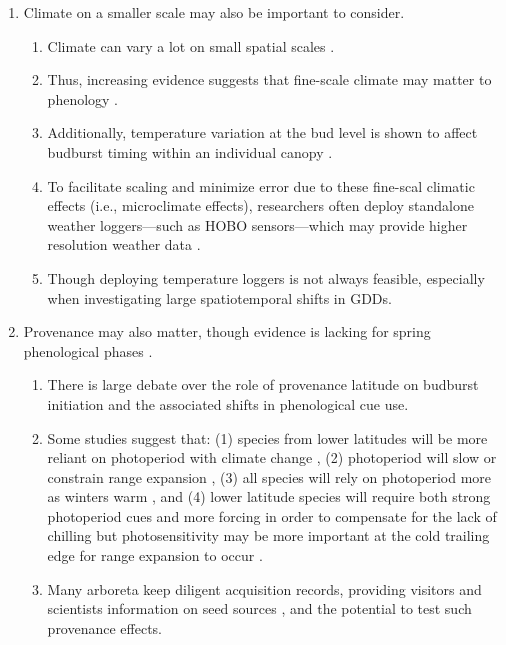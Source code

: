 \documentclass{article}\usepackage[]{graphicx}\usepackage[]{color}
\begin{document}
\begin{enumerate}
\item Climate on a smaller scale may also be important to consider. 
  \begin{enumerate} 
  \item Climate can vary a lot on small spatial scales \citep[][e.g., as much as 2.6$^{\circ}$C between sensors at the same vineyard or up to 6.6$^{\circ}$C within 1 km spatial units in northern Europe]{deResseguier2020,Lenoir2013}.
  \item Thus, increasing evidence suggests that fine-scale climate may matter to phenology \citep{Lembrechts2019}.
  \item Additionally, temperature variation at the bud level is shown to affect budburst timing within an individual canopy \citep{Lembrechts2019}.
  \item To facilitate scaling and minimize error due to these fine-scal climatic effects (i.e., microclimate effects), researchers often deploy standalone weather loggers---such as HOBO sensors---which may provide higher resolution weather data \citep{Schwartz2013a,Whiteman2000}.
  \item Though deploying temperature loggers is not always feasible, especially when investigating large spatiotemporal shifts in GDDs. 
  \end{enumerate}
  
\item Provenance may also matter, though evidence is lacking for spring phenological phases \citep{Aitken2015, McKown2013}.
  \begin{enumerate} 
  \item There is large debate over the role of provenance latitude on budburst initiation and the associated shifts in phenological cue use. 
  \item Some studies suggest that: (1) species from lower latitudes will be more reliant on photoperiod with climate change \citep{Zohner2016}, (2) photoperiod will slow or constrain range expansion \citep{Saikkonen2012}, (3) all species will rely on photoperiod more as winters warm \citep{Way2015}, and (4) lower latitude species will require both strong photoperiod cues and more forcing in order to compensate for the lack of chilling but photosensitivity may be more important at the cold trailing edge for range expansion to occur \citep{Gauzere2017}.
  \item  Many arboreta keep diligent acquisition records, providing visitors and scientists information on seed sources \citep{Dosmann2006}, and the potential to test such provenance effects.
  \end{enumerate}


\end{enumerate}
\end{document}
